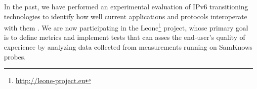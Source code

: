 In the past, we have performed an experimental evaluation of IPv6
transitioning technologies to identify how well current applications and
protocols interoperate with them \cite{vbajpai:2012}. We are now participating
in the Leone\footnote{\url{http://leone-project.eu}} project, whose primary
goal is to define metrics and implement tests that can asses the end-user's
quality of experience by analyzing data collected from measurements running on
SamKnows probes.
